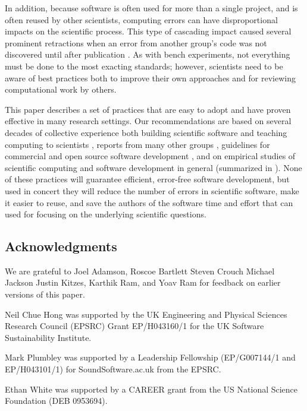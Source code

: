 \documentclass{article}
\begin{document}
In addition, because software is often used for more than a single
project, and is often reused by other scientists, computing errors can
have disproportional impacts on the scientific process. This type of
cascading impact caused several prominent retractions when an error
from another group's code was not discovered until after publication
\cite{merali2010}.  As with bench experiments, not everything must be
done to the most exacting standards; however, scientists need to be
aware of best practices both to improve their own approaches and for
reviewing computational work by others.

This paper describes a set of practices that are easy to adopt and
have proven effective in many research settings.  Our recommendations
are based on several decades of collective experience both building
scientific software and teaching computing to scientists
\cite{aranda2012,wilson2006b}, reports from many other groups
\cite{heroux2009,kane2003,kane2006,killcoyne2009,matthews2008,pitt-francis2008,pouillon2010},
guidelines for commercial and open source software development
\cite{spolsky2000,fogel2005}, and on empirical studies of scientific
computing \cite{carver2007,kelly2009,segal2005,segal2008a} and
software development in general (summarized in \cite{oram2010}). None
of these practices will guarantee efficient, error-free software
development, but used in concert they will reduce the number of errors
in scientific software, make it easier to reuse, and save the authors
of the software time and effort that can used for focusing on the
underlying scientific questions.

\subsection*{Acknowledgments}

We are grateful to
Joel Adamson,
Roscoe Bartlett
Steven Crouch
Michael Jackson
Justin Kitzes,
Karthik Ram,
and
Yoav Ram
for feedback on earlier versions of this paper.

Neil Chue Hong was supported by the UK Engineering and Physical Sciences Research Council (EPSRC)
Grant EP/H043160/1 for the UK Software Sustainability Institute.

Mark Plumbley was supported by a Leadership Fellowship (EP/G007144/1 and EP/H043101/1)
for SoundSoftware.ac.uk from the EPSRC.

Ethan White was supported by a CAREER grant from the US National Science Foundation (DEB 0953694).
\end{document}

